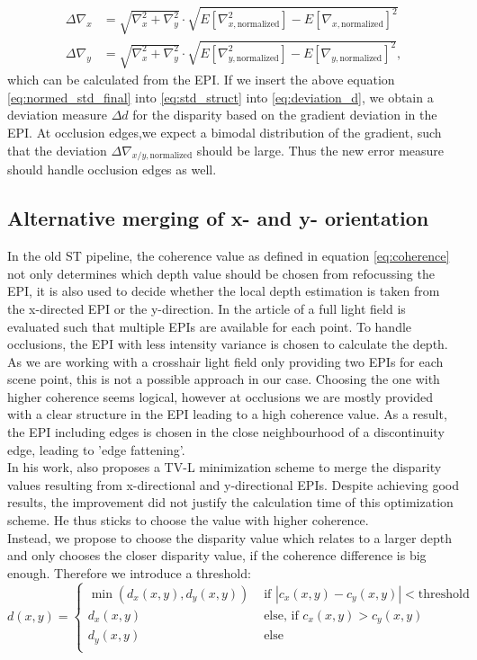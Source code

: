 \documentclass  [
  paper    = a4,
  BCOR     = 10mm,
  twoside,
  fontsize = 12pt,
  fleqn,
  toc      = bibnumbered,
  toc      = listofnumbered,
  numbers  = noendperiod,
  headings = normal,
  listof   = leveldown,
  version  = 3.03
]                                       {scrreprt}
\begin{document}
 \begin{align}\label{eq:normed_std_final}
 \Delta\nabla_{x} &=  \sqrt{\nabla_x^2 + \nabla_y^2} \cdot \sqrt{E[\nabla_{x, \text{normalized}}^2] - E[\nabla_{x, \text{normalized}}]^2}\\
 \Delta\nabla_{y} &= \sqrt{\nabla_x^2 + \nabla_y^2} \cdot \sqrt{E[\nabla_{y, \text{normalized}}^2] - E[\nabla_{y, \text{normalized}}]^2},
 \end{align}
 which can be calculated from the EPI.
 If we insert the above equation \ref{eq:normed_std_final} into \ref{eq:std_struct} into \ref{eq:deviation_d}, we obtain a deviation measure $\Delta d$ for the disparity based on the gradient deviation in the EPI. At occlusion edges,we expect a bimodal distribution of the gradient, such that the deviation $\Delta \nabla_{x/y, \text{normalized}}$ should be large. Thus the new error measure should handle occlusion edges as well.
 
 \subsection{Alternative merging of x- and y- orientation}
 In the old ST pipeline, the coherence value as defined in equation \ref{eq:coherence} not only determines which depth value should be chosen from refocussing the EPI, it is also used to decide whether the local depth estimation is taken from the x-directed EPI or the y-direction. In the article of \cite{sheng2018occlusion} a full light field is evaluated such that multiple EPIs are available for each point. To handle occlusions, the EPI with less intensity variance is chosen to calculate the depth. As we are working with a crosshair light field only providing two EPIs for each scene point, this is not a possible approach in our case. Choosing the one with higher coherence seems logical, however at occlusions we are mostly provided with a clear structure in the EPI leading to a high coherence value. As a result, the EPI including edges is chosen in the close neighbourhood of a discontinuity edge, leading to 'edge fattening'.\\
 In his work, \cite{wanner2014orientation} also proposes a TV-L minimization scheme to merge the disparity values resulting from x-directional and y-directional EPIs. Despite achieving good results, the improvement did not justify the calculation time of this optimization scheme. He thus sticks to choose the value with higher coherence.\\
 Instead, we propose to choose the disparity value which relates to a larger depth and only chooses the closer disparity value, if the coherence difference is big enough. Therefore we introduce a threshold:
 \begin{equation}\label{eq:altmerging}
 d(x,y) = \begin{cases}
 \min(d_x(x,y),d_y(x,y))&\text{ if } |c_x(x,y)-c_y(x,y)|<\text{threshold} \\
  d_x(x,y)&\text{ else, if } c_x(x,y)> c_y(x,y)\\
  d_y(x,y)&\text{ else}\\
  \end{cases}
   \end{equation}
\end{document}
